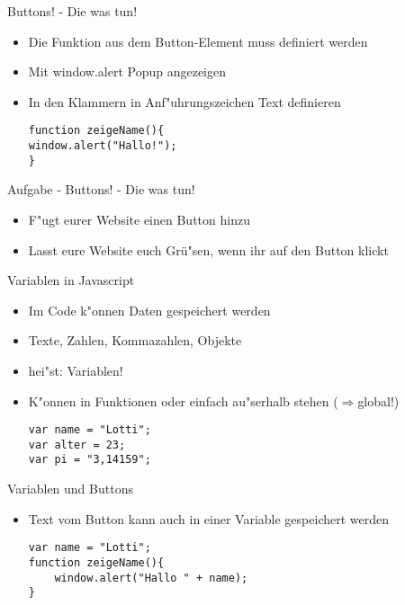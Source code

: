\documentclass[18pt]{beamer}
\begin{document}
\begin{frame}[fragile]{Buttons! - Die was tun!}
\begin {itemize}
\item Die Funktion aus dem Button-Element muss definiert werden
\item  Mit window.alert Popup angezeigen
\item In den Klammern in Anf"uhrungszeichen Text definieren
\begin{lstlisting}
function zeigeName(){
window.alert("Hallo!");
}
\end{lstlisting}
\end {itemize}
\end{frame}



\begin{frame}[fragile]{Aufgabe - Buttons! - Die was tun!}
\begin {itemize}
\item F"ugt eurer Website einen Button hinzu
\item Lasst eure Website euch Grü"sen, wenn ihr auf den Button klickt
\end {itemize}
\end{frame}


\begin{frame}[fragile]{Variablen in Javascript}
\begin{itemize}
\item Im Code k"onnen Daten gespeichert werden
\item Texte, Zahlen, Kommazahlen, Objekte
\item hei"st: Variablen! 
\item K"onnen in Funktionen oder einfach au"serhalb stehen ($\Rightarrow$global!)
\begin{lstlisting}
var name = "Lotti";
var alter = 23;
var pi = "3,14159";
\end{lstlisting}
\end{itemize}
\end{frame}

\begin{frame}[fragile]{Variablen und Buttons}
\begin{itemize}
\item Text vom Button kann auch in einer Variable gespeichert werden
\begin{lstlisting}
var name = "Lotti";
function zeigeName(){
	window.alert("Hallo " + name);
}
\end{lstlisting}
\end{itemize}
\end{frame}
\end{document}
